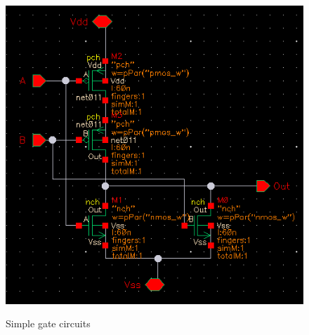 \begin{figure}[H]
  {\includegraphics[scale=0.5]{img/nor.png}}
  \caption{Simple gate circuits}
  \label{fig:gates}
\end{figure}